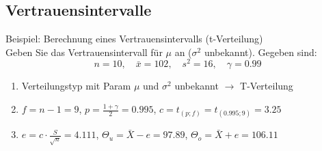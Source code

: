 \subsection{Vertrauensintervalle}

\begin{example2}{Beispiel: Berechnung eines Vertrauensintervalls (t-Verteilung)}\\
Geben Sie das Vertrauensintervall für $\mu$ an ($\sigma^2$ unbekannt). Gegeben sind:
$$
n=10, \quad \bar{x}=102, \quad s^2=16, \quad \gamma=0.99
$$

\begin{enumerate}
  \item Verteilungstyp mit Param $\mu$ und $\sigma^2$ unbekannt $\rightarrow$ T-Verteilung
  \item $f=n-1=9$, $p=\frac{1+\gamma}{2}=0.995$, $c=t_{(p;f)}=t_{(0.995;9)}=3.25$
  \item $e=c \cdot \frac{S}{\sqrt{n}}=4.111$, $\Theta_u=\bar{X}-e=97.89$, $\Theta_o=\bar{X}+e=106.11$
\end{enumerate}
\end{example2}